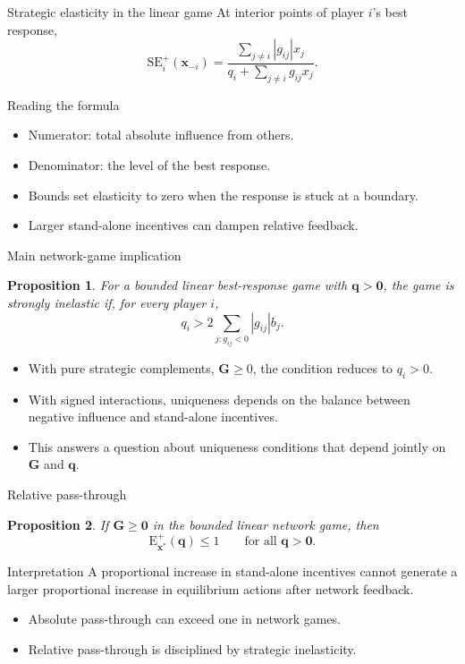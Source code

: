 \documentclass[11pt,aspectratio=169]{beamer}
\theoremstyle{plain}
\newtheorem{myproposition}{Proposition}
\theoremstyle{definition}
\newenvironment{wideitemize}
  {\begin{itemize}\setlength{\itemsep}{0.72em}}
  {\end{itemize}}
\newcommand{\G}{\mathbf{G}}
\newcommand{\q}{\mathbf{q}}
\newcommand{\x}{\mathbf{x}}
\newcommand{\0}{\mathbf{0}}
\newcommand{\SE}{\mathrm{SE}}
\newcommand{\E}{\mathrm{E}}
\begin{document}
\begin{frame}{Strategic elasticity in the linear game}
\small
At interior points of player $i$'s best response,
\[
\SE_i^+(\x_{-i})
=
\frac{\sum_{j\ne i}|g_{ij}|x_j}
{q_i+\sum_{j\ne i}g_{ij}x_j}.
\]

\begin{block}{Reading the formula}
\begin{wideitemize}
    \item Numerator: total absolute influence from others.
    \item Denominator: the level of the best response.
    \item Bounds set elasticity to zero when the response is stuck at a boundary.
    \item Larger stand-alone incentives can dampen relative feedback.
\end{wideitemize}
\end{block}
\end{frame}

\begin{frame}{Main network-game implication}
\begin{myproposition}
For a bounded linear best-response game with $\q>\0$, the game is strongly
inelastic if, for every player $i$,
\[
q_i>
2\sum_{j:g_{ij}<0}|g_{ij}|b_j.
\]
\end{myproposition}

\begin{wideitemize}
    \item With pure strategic complements, $\G\ge0$, the condition reduces to $q_i>0$.
    \item With signed interactions, uniqueness depends on the balance between negative influence and stand-alone incentives.
    \item This answers a question about uniqueness conditions that depend jointly on $\G$ and $\q$.
\end{wideitemize}
\end{frame}

\begin{frame}{Relative pass-through}
\begin{myproposition}
If $\G\ge \0$ in the bounded linear network game, then
\[
\E_{\x^*}^+(\q)\le 1
\qquad
\text{for all }\q>\0.
\]
\end{myproposition}

\begin{block}{Interpretation}
A proportional increase in stand-alone incentives cannot generate a larger
proportional increase in equilibrium actions after network feedback.
\end{block}

\begin{wideitemize}
    \item Absolute pass-through can exceed one in network games.
    \item Relative pass-through is disciplined by strategic inelasticity.
\end{wideitemize}
\end{frame}
\end{document}
